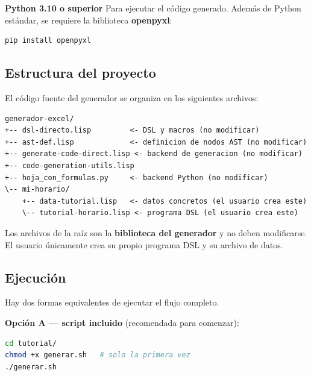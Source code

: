 \documentclass[12pt,a4paper]{report}
\begin{document}
\textbf{Python 3.10 o superior} \quad Para ejecutar el código generado.
Además de Python estándar, se requiere la biblioteca \textbf{openpyxl}:

\begin{lstlisting}[language=bash, numbers=none, backgroundcolor=\color{gray!10},
                   basicstyle=\ttfamily\small, keywordstyle={}]
pip install openpyxl
\end{lstlisting}

\subsection{Estructura del proyecto}

El código fuente del generador se organiza en los siguientes archivos:

\begin{lstlisting}[language={}, numbers=none, backgroundcolor=\color{gray!10},
                   basicstyle=\ttfamily\small]
generador-excel/
+-- dsl-directo.lisp         <- DSL y macros (no modificar)
+-- ast-def.lisp             <- definicion de nodos AST (no modificar)
+-- generate-code-direct.lisp <- backend de generacion (no modificar)
+-- code-generation-utils.lisp
+-- hoja_con_formulas.py     <- backend Python (no modificar)
\-- mi-horario/
    +-- data-tutorial.lisp   <- datos concretos (el usuario crea este)
    \-- tutorial-horario.lisp <- programa DSL (el usuario crea este)
\end{lstlisting}

Los archivos de la raíz son la \textbf{biblioteca del generador} y no
deben modificarse.  El usuario únicamente crea su propio programa DSL
y su archivo de datos.

\subsection{Ejecución}


Hay dos formas equivalentes de ejecutar el flujo completo.

\textbf{Opción A — script incluido} (recomendada para comenzar):

\begin{lstlisting}[language=bash, numbers=none, backgroundcolor=\color{gray!10},
                   basicstyle=\ttfamily\small, keywordstyle={}]
cd tutorial/
chmod +x generar.sh   # solo la primera vez
./generar.sh
\end{lstlisting}
\end{document}
